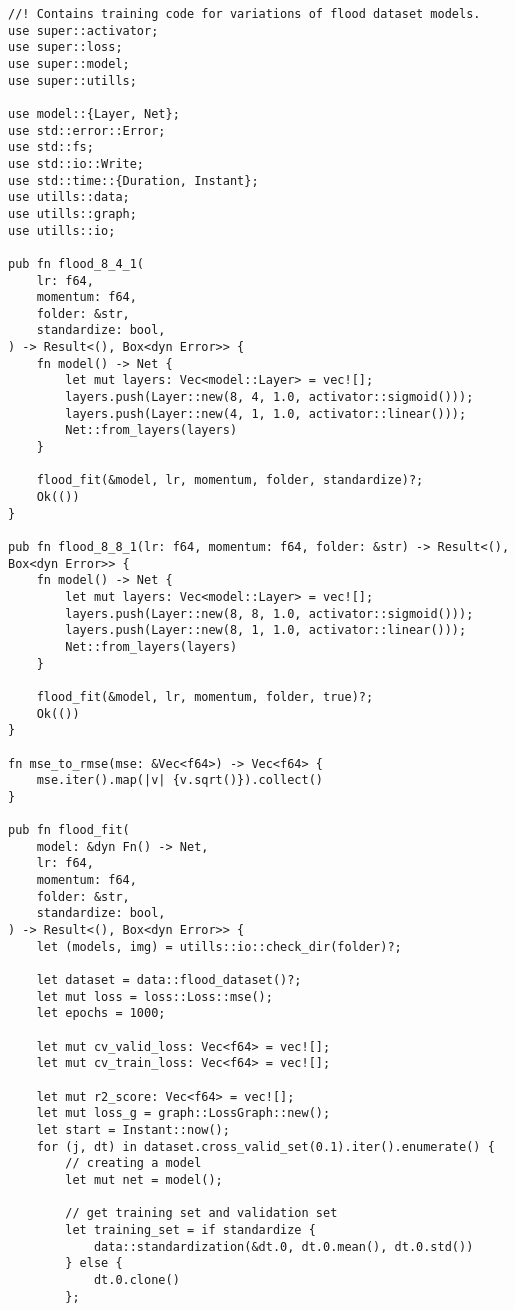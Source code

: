 \begin{verbatim}
//! Contains training code for variations of flood dataset models.
use super::activator;
use super::loss;
use super::model;
use super::utills;

use model::{Layer, Net};
use std::error::Error;
use std::fs;
use std::io::Write;
use std::time::{Duration, Instant};
use utills::data;
use utills::graph;
use utills::io;

pub fn flood_8_4_1(
    lr: f64,
    momentum: f64,
    folder: &str,
    standardize: bool,
) -> Result<(), Box<dyn Error>> {
    fn model() -> Net {
        let mut layers: Vec<model::Layer> = vec![];
        layers.push(Layer::new(8, 4, 1.0, activator::sigmoid()));
        layers.push(Layer::new(4, 1, 1.0, activator::linear()));
        Net::from_layers(layers)
    }

    flood_fit(&model, lr, momentum, folder, standardize)?;
    Ok(())
}

pub fn flood_8_8_1(lr: f64, momentum: f64, folder: &str) -> Result<(), Box<dyn Error>> {
    fn model() -> Net {
        let mut layers: Vec<model::Layer> = vec![];
        layers.push(Layer::new(8, 8, 1.0, activator::sigmoid()));
        layers.push(Layer::new(8, 1, 1.0, activator::linear()));
        Net::from_layers(layers)
    }

    flood_fit(&model, lr, momentum, folder, true)?;
    Ok(())
}

fn mse_to_rmse(mse: &Vec<f64>) -> Vec<f64> {
    mse.iter().map(|v| {v.sqrt()}).collect()
}

pub fn flood_fit(
    model: &dyn Fn() -> Net,
    lr: f64,
    momentum: f64,
    folder: &str,
    standardize: bool,
) -> Result<(), Box<dyn Error>> {
    let (models, img) = utills::io::check_dir(folder)?;

    let dataset = data::flood_dataset()?;
    let mut loss = loss::Loss::mse();
    let epochs = 1000;

    let mut cv_valid_loss: Vec<f64> = vec![];
    let mut cv_train_loss: Vec<f64> = vec![];

    let mut r2_score: Vec<f64> = vec![];
    let mut loss_g = graph::LossGraph::new();
    let start = Instant::now();
    for (j, dt) in dataset.cross_valid_set(0.1).iter().enumerate() {
        // creating a model
        let mut net = model();

        // get training set and validation set
        let training_set = if standardize {
            data::standardization(&dt.0, dt.0.mean(), dt.0.std())
        } else {
            dt.0.clone()
        };


\end{verbatim}
